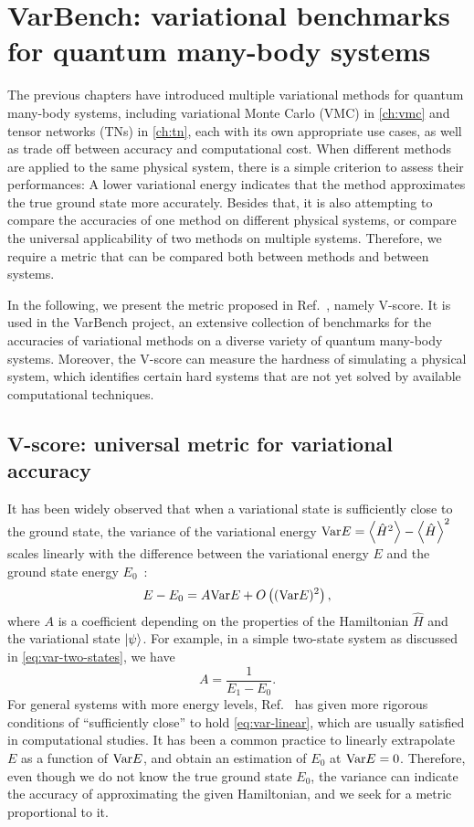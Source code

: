 \chapter{VarBench: variational benchmarks for quantum many-body systems}
\label{ch:varbench}

The previous chapters have introduced multiple variational methods for quantum many-body systems, including variational Monte Carlo (VMC) in \cref{ch:vmc} and tensor networks (TNs) in \cref{ch:tn}, each with its own appropriate use cases, as well as trade off between accuracy and computational cost. When different methods are applied to the same physical system, there is a simple criterion to assess their performances: A lower variational energy indicates that the method approximates the true ground state more accurately. Besides that, it is also attempting to compare the accuracies of one method on different physical systems, or compare the universal applicability of two methods on multiple systems. Therefore, we require a metric that can be compared both between methods and between systems.

In the following, we present the metric proposed in Ref.~\cite{wu2024variational}, namely V-score. It is used in the VarBench project, an extensive collection of benchmarks for the accuracies of variational methods on a diverse variety of quantum many-body systems. Moreover, the V-score can measure the hardness of simulating a physical system, which identifies certain hard systems that are not yet solved by available computational techniques.

\section{V-score: universal metric for variational accuracy}

It has been widely observed that when a variational state is sufficiently close to the ground state, the variance of the variational energy $\Var E = \ev{\hat{H}^2} - \ev{\hat{H}}^2$ scales linearly with the difference between the variational energy $E$ and the ground state energy $E_0$~\cite{kwon1993, imada2000, sorella2001}:
\begin{equation}
E  - E_0 = A \mathrm{Var} E + O\left( (\mathrm{Var} E)^2 \right),
\label{eq:var-linear}
\end{equation}
where $A$ is a coefficient depending on the properties of the Hamiltonian $\hat{H}$ and the variational state $\ket{\psi}$. For example, in a simple two-state system as discussed in \cref{eq:var-two-states}, we have
\begin{equation}
A = \frac{1}{E_1 - E_0}.
\end{equation}
For general systems with more energy levels, Ref.~\cite{taddei2015iterative} has given more rigorous conditions of ``sufficiently close'' to hold \cref{eq:var-linear}, which are usually satisfied in computational studies. It has been a common practice to linearly extrapolate $E$ as a function of $\mathrm{Var} E$, and obtain an estimation of $E_0$ at $\mathrm{Var} E = 0$. Therefore, even though we do not know the true ground state $E_0$, the variance can indicate the accuracy of approximating the given Hamiltonian, and we seek for a metric proportional to it.

